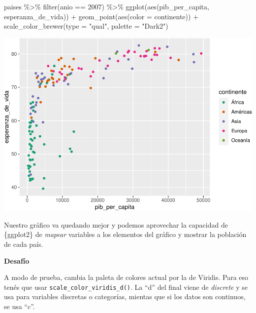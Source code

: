 \documentclass[
  openany]{book}
\newenvironment{Shaded}{\begin{snugshade}}{\end{snugshade}}
\newcommand{\AttributeTok}[1]{\textcolor[rgb]{0.77,0.63,0.00}{#1}}
\newcommand{\DecValTok}[1]{\textcolor[rgb]{0.00,0.00,0.81}{#1}}
\newcommand{\FunctionTok}[1]{\textcolor[rgb]{0.00,0.00,0.00}{#1}}
\newcommand{\NormalTok}[1]{#1}
\newcommand{\SpecialCharTok}[1]{\textcolor[rgb]{0.00,0.00,0.00}{#1}}
\newcommand{\StringTok}[1]{\textcolor[rgb]{0.31,0.60,0.02}{#1}}
\begin{document}
\begin{Shaded}
\begin{Highlighting}[]
\NormalTok{paises }\SpecialCharTok{\%\textgreater{}\%} 
  \FunctionTok{filter}\NormalTok{(anio }\SpecialCharTok{==} \DecValTok{2007}\NormalTok{) }\SpecialCharTok{\%\textgreater{}\%} 
  \FunctionTok{ggplot}\NormalTok{(}\FunctionTok{aes}\NormalTok{(pib\_per\_capita, esperanza\_de\_vida)) }\SpecialCharTok{+}
  \FunctionTok{geom\_point}\NormalTok{(}\FunctionTok{aes}\NormalTok{(}\AttributeTok{color =}\NormalTok{ continente)) }\SpecialCharTok{+}
  \FunctionTok{scale\_color\_brewer}\NormalTok{(}\AttributeTok{type =} \StringTok{"qual"}\NormalTok{, }\AttributeTok{palette =} \StringTok{"Dark2"}\NormalTok{)}
\end{Highlighting}
\end{Shaded}

\begin{center}\includegraphics[width=1\linewidth]{DT6_files/figure-latex/unnamed-chunk-131-1} \end{center}

Nuestro gráfico va quedando mejor y podemos aprovechar la capacidad de \{ggplot2\} de \emph{mapear} variables a los elementos del gráfico y mostrar la población de cada país.

\textbf{Desafío}

A modo de prueba, cambia la paleta de colores actual por la de Viridis.
Para eso tenés que usar \texttt{scale\_color\_viridis\_d()}.
La ``d'' del final viene de \emph{discrete} y se usa para variables discretas o categorías, mientas que si los datos son continuos, se usa ``c''.
\end{document}
